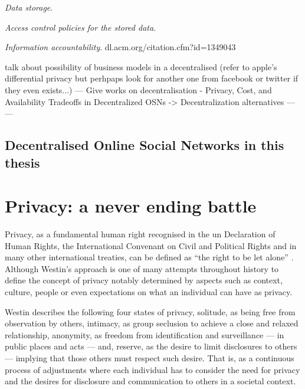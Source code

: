 \documentclass[showtrims,oldfontcommands]{kthesis}
\begin{document}
\textit{Data storage}. 

\textit{Access control policies for the stored data}. 

\textit{Information accountability}. 
dl.acm.org/citation.cfm?id=1349043



talk about possibility of business models in a decentralised (refer to apple's differential 
privacy but perhpaps look for another one from facebook or twitter if they even exists...)
---
Give works on decentralisation
 - Privacy, Cost, and Availability Tradeoffs in Decentralized OSNs -> Decentralization alternatives
   \cite{ShakimovVCC09}
---
---


\subsection{Decentralised Online Social Networks in this thesis}
    \label{subsection:dosns-in-this-thesis}

\section{Privacy: a never ending battle}
    \label{section:privacy-a-never-ending-battle}

Privacy, as a fundamental human right recognised in the \ac{un} Declaration of Human 
Rights, the International Convenant on Civil and Political Rights and in many other 
international treaties, can be defined as ``the right to be let alone'' \cite{Westin70}. 
Although Westin's approach is one of many attempts throughout history to define 
the concept of privacy notably determined by aspects such as context, culture, people 
or even expectations on what an individual can have as privacy.

Westin describes the following four states of privacy, solitude, as being free from 
observation by others, intimacy, as group seclusion to achieve a close and relaxed 
relationship, anonymity, as freedom from identification and surveillance --- in 
public places and acts --- and, reserve, as the desire to limit disclosures to others 
--- implying that those others must respect such desire. That is, as a continuous 
process of adjustments where each individual has to consider the need for privacy 
and the desires for disclosure and communication to others in a societal context.
\end{document}
